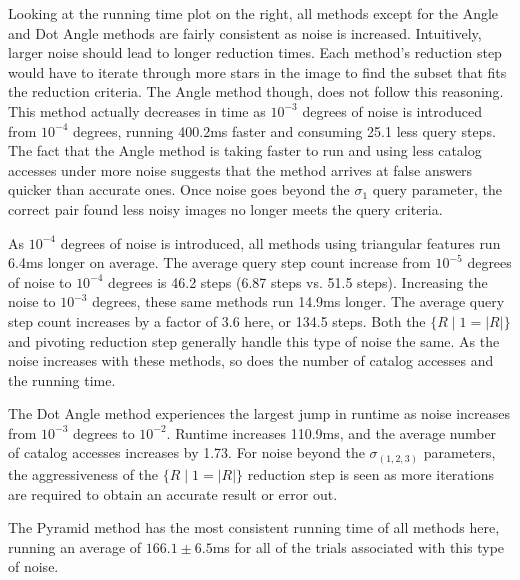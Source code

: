 Looking at the running time plot on the right, all methods except for the Angle and Dot Angle methods are fairly
consistent as noise is increased.
Intuitively, larger noise should lead to longer reduction times.
Each method's reduction step would have to iterate through more stars in the image to find the subset that fits the
reduction criteria.
The Angle method though, does not follow this reasoning.
This method actually decreases in time as $10^{-3}$ degrees of noise is introduced from $10^{-4}$ degrees, running
400.2ms faster and consuming 25.1 less query steps.
The fact that the Angle method is taking faster to run and using less catalog accesses under more noise suggests that
the method arrives at false answers quicker than accurate ones.
Once noise goes beyond the $\sigma_1$ query parameter, the correct pair found less noisy images no longer meets the
query criteria.

As $10^{-4}$ degrees of noise is introduced, all methods using triangular features run 6.4ms longer on average.
The average query step count increase from $10^{-5}$ degrees of noise to $10^{-4}$ degrees is 46.2 steps (6.87 steps vs.
51.5 steps).
Increasing the noise to $10^{-3}$ degrees, these same methods run 14.9ms longer.
The average query step count increases by a factor of 3.6 here, or 134.5 steps.
Both the $\{ R \mid 1 = |R| \}$ and pivoting reduction step generally handle this type of noise the same.
As the noise increases with these methods, so does the number of catalog accesses and the running time.

The Dot Angle method experiences the largest jump in runtime as noise increases from $10^{-3}$ degrees to $10^{-2}$.
Runtime increases 110.9ms, and the average number of catalog accesses increases by 1.73.
For noise beyond the $\sigma_{(1, 2, 3)}$ parameters, the aggressiveness of the $\{ R \mid 1 = |R| \}$ reduction step
is seen as more iterations are required to obtain an accurate result or error out.

The Pyramid method has the most consistent running time of all methods here, running an average of
$166.1 \pm 6.5$ms for all of the trials associated with this type of noise.

